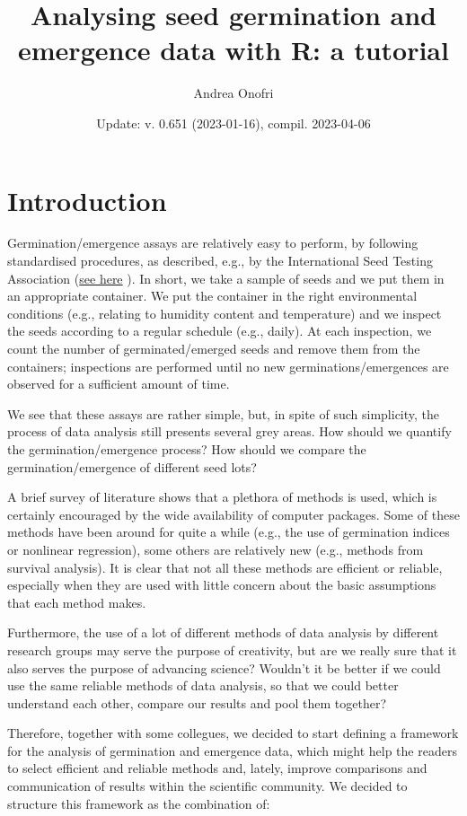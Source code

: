 \documentclass[
]{book}
\title{Analysing seed germination and emergence data with R: a tutorial}
\author{Andrea Onofri}
\date{Update: v. 0.651 (2023-01-16), compil. 2023-04-06}
\begin{document}
\maketitle

{
\setcounter{tocdepth}{1}
\tableofcontents
}
\hypertarget{introduction}{%
\chapter{Introduction}\label{introduction}}

Germination/emergence assays are relatively easy to perform, by following standardised procedures, as described, e.g., by the International Seed Testing Association (\href{https://www.ingentaconnect.com/content/ista/rules/2019/00002019/00000001}{see here} ). In short, we take a sample of seeds and we put them in an appropriate container. We put the container in the right environmental conditions (e.g., relating to humidity content and temperature) and we inspect the seeds according to a regular schedule (e.g., daily). At each inspection, we count the number of germinated/emerged seeds and remove them from the containers; inspections are performed until no new germinations/emergences are observed for a sufficient amount of time.

We see that these assays are rather simple, but, in spite of such simplicity, the process of data analysis still presents several grey areas. How should we quantify the germination/emergence process? How should we compare the germination/emergence of different seed lots?

A brief survey of literature shows that a plethora of methods is used, which is certainly encouraged by the wide availability of computer packages. Some of these methods have been around for quite a while (e.g., the use of germination indices or nonlinear regression), some others are relatively new (e.g., methods from survival analysis). It is clear that not all these methods are efficient or reliable, especially when they are used with little concern about the basic assumptions that each method makes.

Furthermore, the use of a lot of different methods of data analysis by different research groups may serve the purpose of creativity, but are we really sure that it also serves the purpose of advancing science? Wouldn't it be better if we could use the same reliable methods of data analysis, so that we could better understand each other, compare our results and pool them together?

Therefore, together with some collegues, we decided to start defining a framework for the analysis of germination and emergence data, which might help the readers to select efficient and reliable methods and, lately, improve comparisons and communication of results within the scientific community. We decided to structure this framework as the combination of:
\end{document}
